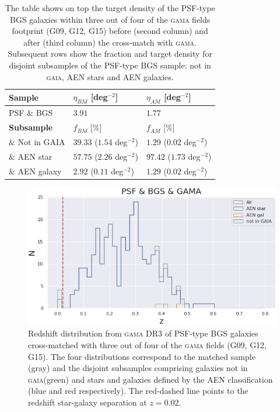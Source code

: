 \documentclass[fleqn,usenatbib]{mnras}
\newcommand{\GAMA}{\textsc{gama}\xspace}
\newcommand{\GAIA}{\textsc{gaia}\xspace}
\begin{document}
\begin{table}
\centering
\begin{tabular}{ |p{2cm}||p{2.5cm}|p{2.5cm}| }
 \hline
 {\bf Sample} & $\eta_{BM}$ [deg$^{-2}$] & $\eta_{AM}$ [deg$^{-2}$] \\
 \hline
 PSF $\&$ BGS & $3.91$ & $1.77$ \\
 \hline
 \hline
 {\bf Subsample} & $f_{BM}$ [$\%$] & $f_{AM}$ [$\%$] \\
 \hline
 $\&$ Not in GAIA  & $39.33$ ($1.54$ deg$^{-2}$) & $1.29$ ($0.02$ deg$^{-2}$) \\
 $\&$ AEN star  & $57.75$ ($2.26$ deg$^{-2}$) & $97.42$ ($1.73$ deg$^{-2}$) \\
 $\&$ AEN galaxy  & $2.92$ ($0.11$ deg$^{-2}$) & $1.29$ ($0.02$ deg$^{-2}$) \\
 \hline
\end{tabular}
\caption{The table shows on top the target density of the PSF-type BGS galaxies within three out of four of the \GAMA fields footprint (G09, G12, G15) before (second column) and after (third column) the cross-match with \GAMA. Subsequent rows show the fraction and target density for disjoint subsamples of the PSF-type BGS sample: not in \GAIA, AEN stars and AEN galaxies.}
\label{tab:bgs_psf_gama}
\end{table}

\begin{figure}
	\includegraphics[width=\columnwidth]{images/psf_bgs_gama_redshift}
    \caption{Redshift distribution from \GAMA DR3 of PSF-type BGS galaxies cross-matched with three out of four of the \GAMA fields (G09, G12, G15). The four distributions correspond to the matched sample (gray) and the disjoint subsamples comprising galaxies not in \GAIA (green) and stars and galaxies defined by the AEN classification (blue and red respectively). The red-dashed line points to the redshift star-galaxy separation at $z=0.02$.}
    \label{fig:matched_sample_z}
\end{figure}
\end{document}
